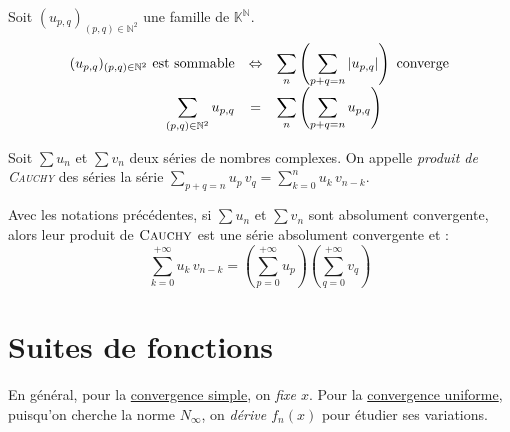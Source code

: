 \documentclass[11pt,a4paper,fleqn,pdftex]{report}
\begin{document}
\begin{itheorem}
     Soit $(u_{p,q})_{(p,q)\in \mathbb{N}^2}$ une famille de $\mathbb{K}^{\mathbb{N}}$.\newline
     \begin{equation}
          \begin{array}{r c l}
               (u_{p,q})_{(p,q)\in \mathbb{N}^2} \text{ est sommable} & \Leftrightarrow & \displaystyle\sum_n \left( \displaystyle\sum_{p+q = n} |u_{p,q}| \right)\text{ converge} \\
               \displaystyle\sum_{(p,q)\in \mathbb{N}^2} u_{p,q} & = & \displaystyle\sum_n \left( \displaystyle\sum_{p+q = n} u_{p,q} \right) \\
          \end{array}
     \end{equation}
\end{itheorem}
\begin{dfn}
     Soit $\sum u_n$ et $\sum v_n$ deux séries de nombres complexes. On appelle \emph{produit de \textsc{Cauchy}} des séries la série $\sum_{p+q=n} u_p\, v_q = \sum_{k=0}^n u_k \, v_{n-k}$.
\end{dfn}
\begin{theorem}
     Avec les notations précédentes, si $\sum u_n$ et $\sum v_n$ sont absolument convergente, alors leur produit de $\textsc{Cauchy}$ est une série absolument convergente et : 
        \begin{equation}
        \sum_{k=0}^{+\infty} u_k \, v_{n-k} = \left( \sum_{p=0}^{+\infty} u_p \right) \left( \sum_{q=0}^{+\infty} v_q \right) 
        \end{equation}
        
\end{theorem}
\chapter{Suites de fonctions}
\begin{methode}
    En général, pour la \uline{convergence simple}, on \emph{fixe $x$}. Pour la \uline{convergence uniforme}, puisqu'on cherche la norme $N_\infty$, on \emph{dérive $f_n(x)$} pour étudier ses variations.
\end{methode}
\end{document}
